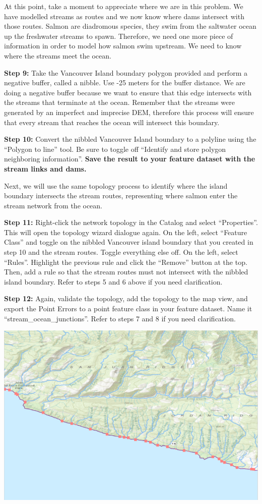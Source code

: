 \documentclass[
]{book}
\begin{document}
At this point, take a moment to appreciate where we are in this problem. We have modelled streams as routes and we now know where dams intersect with those routes. Salmon are diadromous species, they swim from the saltwater ocean up the freshwater streams to spawn. Therefore, we need one more piece of information in order to model how salmon swim upstream. We need to know where the streams meet the ocean.

\textbf{Step 9:} Take the Vancouver Island boundary polygon provided and perform a negative buffer, called a nibble. Use -25 meters for the buffer distance. We are doing a negative buffer because we want to ensure that this edge intersects with the streams that terminate at the ocean. Remember that the streams were generated by an imperfect and imprecise DEM, therefore this process will ensure that every stream that reaches the ocean will intersect this boundary.

\textbf{Step 10:} Convert the nibbled Vancouver Island boundary to a polyline using the ``Polygon to line'' tool. Be sure to toggle off ``Identify and store polygon neighboring information''. \textbf{Save the result to your feature dataset with the stream links and dams.}

Next, we will use the same topology process to identify where the island boundary intersects the stream routes, representing where salmon enter the stream network from the ocean.

\textbf{Step 11:} Right-click the network topology in the Catalog and select ``Properties''. This will open the topology wizard dialogue again. On the left, select ``Feature Class'' and toggle on the nibbled Vancouver island boundary that you created in step 10 and the stream routes. Toggle everything else off. On the left, select ``Rules''. Highlight the previous rule and click the ``Remove'' button at the top. Then, add a rule so that the stream routes must not intersect with the nibbled island boundary. Refer to steps 5 and 6 above if you need clarification.

\textbf{Step 12:} Again, validate the topology, add the topology to the map view, and export the Point Errors to a point feature class in your feature dataset. Name it ``stream\_ocean\_junctions''. Refer to steps 7 and 8 if you need clarification.

\includegraphics[width=1\linewidth]{images/02-ocean-stream-junctions}
\end{document}
